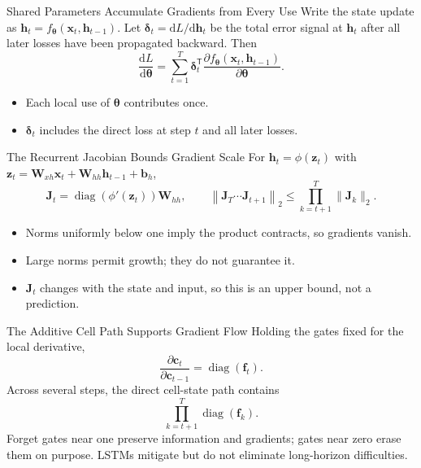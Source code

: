 \documentclass{ntuabeamer}
\begin{document}
\appendix


\begin{frame}{Shared Parameters Accumulate Gradients from Every Use}
  Write the state update as $\mathbf h_t=f_{\boldsymbol\theta}(\mathbf x_t,\mathbf h_{t-1})$.
  Let $\boldsymbol\delta_t=\mathrm dL/\mathrm d\mathbf h_t$ be the total error signal at $\mathbf h_t$
  after all later losses have been propagated backward. Then
  \[
    \frac{\mathrm d L}{\mathrm d\boldsymbol\theta}
    =\sum_{t=1}^{T}
      \boldsymbol\delta_t^{\mathsf T}
      \frac{\partial f_{\boldsymbol\theta}
      (\mathbf x_t,\mathbf h_{t-1})}{\partial\boldsymbol\theta}.
  \]
  \begin{itemize}
    \item Each local use of $\boldsymbol\theta$ contributes once.
    \item $\boldsymbol\delta_t$ includes the direct loss at step $t$ and all later losses.
  \end{itemize}
\end{frame}

\begin{frame}{The Recurrent Jacobian Bounds Gradient Scale}
  For $\mathbf h_t=\phi(\mathbf z_t)$ with $\mathbf z_t=\mathbf W_{xh}\mathbf x_t+\mathbf W_{hh}\mathbf h_{t-1}+\mathbf b_h$,
  \[
    \mathbf J_t
    =\operatorname{diag}(\phi'(\mathbf z_t))\mathbf W_{hh},
    \qquad
    \left\|\mathbf J_T\cdots\mathbf J_{t+1}\right\|_2
    \leq \prod_{k=t+1}^{T}\|\mathbf J_k\|_2.
  \]
  \begin{itemize}
    \item Norms uniformly below one imply the product contracts, so gradients vanish.
    \item Large norms permit growth; they do not guarantee it.
    \item $\mathbf J_t$ changes with the state and input, so this is an upper bound, not a prediction.
  \end{itemize}
\end{frame}

\begin{frame}{The Additive Cell Path Supports Gradient Flow}
  Holding the gates fixed for the local derivative,
  \[
    \frac{\partial\mathbf c_t}{\partial\mathbf c_{t-1}}
    =\operatorname{diag}(\mathbf f_t).
  \]
  Across several steps, the direct cell-state path contains
  \[
    \prod_{k=t+1}^{T}\operatorname{diag}(\mathbf f_k).
  \]
  Forget gates near one preserve information and gradients; gates near zero erase them on purpose.
  LSTMs mitigate but do not eliminate long-horizon difficulties.
\end{frame}
\end{document}
